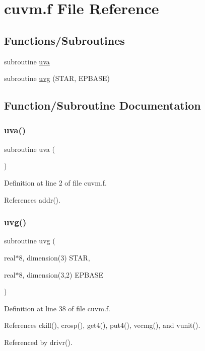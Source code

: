 \hypertarget{cuvm_8f}{}\section{cuvm.\+f File Reference}
\label{cuvm_8f}
\subsection*{Functions/\+Subroutines}
\begin{DoxyCompactItemize}
\item 
subroutine \hyperlink{cuvm_8f_a67039740c712665e98db6eb490ff7cda}{uva}
\item 
subroutine \hyperlink{cuvm_8f_ad4eb7b3cca55ea7ad3595a8a62a06f45}{uvg} (S\+T\+AR, E\+P\+B\+A\+SE)
\end{DoxyCompactItemize}


\subsection{Function/\+Subroutine Documentation}
\mbox{\label{cuvm_8f_a67039740c712665e98db6eb490ff7cda}} 
\subsubsection{\texorpdfstring{uva()}{uva()}}
{\footnotesize\ttfamily subroutine uva (\begin{DoxyParamCaption}{ }\end{DoxyParamCaption})}



Definition at line 2 of file cuvm.\+f.



References addr().

\mbox{\label{cuvm_8f_ad4eb7b3cca55ea7ad3595a8a62a06f45}} 
\subsubsection{\texorpdfstring{uvg()}{uvg()}}
{\footnotesize\ttfamily subroutine uvg (\begin{DoxyParamCaption}\item[{real$\ast$8, dimension(3)}]{S\+T\+AR,  }\item[{real$\ast$8, dimension(3,2)}]{E\+P\+B\+A\+SE }\end{DoxyParamCaption})}



Definition at line 38 of file cuvm.\+f.



References ckill(), crosp(), get4(), put4(), vecmg(), and vunit().



Referenced by drivr().

